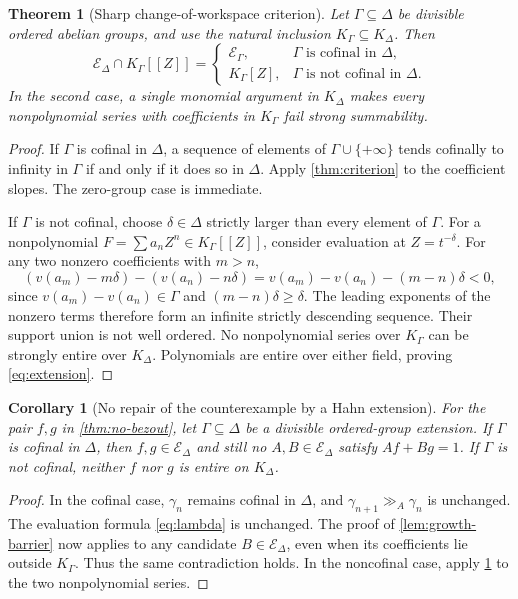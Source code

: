 \documentclass[11pt]{article}
\newtheorem{theorem}{Theorem}[section]
\theoremstyle{plain}
\theoremstyle{plain}
\theoremstyle{plain}
\newtheorem{corollary}[corollary]{Corollary}
\theoremstyle{definition}
\theoremstyle{definition}
\theoremstyle{definition}
\theoremstyle{remark}
\newcommand{\ggA}{\mathrel{\gg_{\!A}}}
\begin{document}
\begin{theorem}[Sharp change-of-workspace criterion]
\label{thm:extension}
Let $\Gamma\subseteq\Delta$ be divisible ordered abelian groups,
and use the natural inclusion $K_\Gamma\subseteq K_\Delta$.
Then
\begin{equation}\label{eq:extension}
 \mathcal E_\Delta\cap K_\Gamma[[Z]]=
 \begin{cases}
   \mathcal E_\Gamma,&\Gamma\text{ is cofinal in }\Delta,\\
   K_\Gamma[Z],&\Gamma\text{ is not cofinal in }\Delta.
 \end{cases}
\end{equation}
In the second case, a single monomial argument in $K_\Delta$ makes
\emph{every} nonpolynomial series with coefficients in $K_\Gamma$
fail strong summability.
\end{theorem}
\begin{proof}
If $\Gamma$ is cofinal in $\Delta$, a sequence of elements of
$\Gamma\cup\{+\infty\}$ tends cofinally to infinity in $\Gamma$
if and only if it does so in $\Delta$. Apply
\cref{thm:criterion} to the coefficient slopes. The zero-group
case is immediate.

If $\Gamma$ is not cofinal, choose $\delta\in\Delta$ strictly larger
than every element of $\Gamma$. For a nonpolynomial
$F=\sum a_nZ^n\in K_\Gamma[[Z]]$, consider evaluation at
$Z=t^{-\delta}$. For any two nonzero coefficients with $m>n$,
\[
 (v(a_m)-m\delta)-(v(a_n)-n\delta)
       =v(a_m)-v(a_n)-(m-n)\delta<0,
\]
since $v(a_m)-v(a_n)\in\Gamma$ and $(m-n)\delta\ge\delta$.
The leading exponents of the nonzero terms therefore form an
infinite strictly descending sequence. Their support union is not
well ordered. No nonpolynomial series over $K_\Gamma$ can be
strongly entire over $K_\Delta$. Polynomials are entire over either
field, proving \eqref{eq:extension}.
\end{proof}

\begin{corollary}[No repair of the counterexample by a Hahn extension]
\label{cor:no-repair}
For the pair $f,g$ in \cref{thm:no-bezout}, let
$\Gamma\subseteq\Delta$ be a divisible ordered-group extension.
If $\Gamma$ is cofinal in $\Delta$, then $f,g\in\mathcal E_\Delta$
and still no $A,B\in\mathcal E_\Delta$ satisfy $Af+Bg=1$.
If $\Gamma$ is not cofinal, neither $f$ nor $g$ is entire on
$K_\Delta$.
\end{corollary}
\begin{proof}
In the cofinal case, $\gamma_n$ remains cofinal in $\Delta$,
and $\gamma_{n+1}\ggA\gamma_n$ is unchanged. The evaluation
formula \eqref{eq:lambda} is unchanged. The proof of
\cref{lem:growth-barrier} now applies to any candidate
$B\in\mathcal E_\Delta$, even when its coefficients lie outside
$K_\Gamma$. Thus the same contradiction holds.
In the noncofinal case, apply \cref{thm:extension} to the two
nonpolynomial series.
\end{proof}
\end{document}
